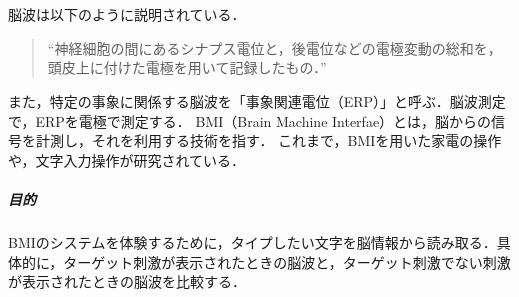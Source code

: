 \chapter{\kadaie}
\section{\purpose}
脳波は以下のように説明されている．
\begin{quote}
    ``神経細胞の間にあるシナプス電位と，後電位などの電極変動の総和を，頭皮上に付けた電極を用いて記録したもの．''
    \\\hfill\cite{自己心理学セミナー}
\end{quote}
また，特定の事象に関係する脳波を「事象関連電位（ERP）」と呼ぶ．脳波測定で，ERPを電極で測定する．
BMI（Brain Machine Interfae）とは，脳からの信号を計測し，それを利用する技術を指す\cite{脳波による実用的なBMI研究開発}．
これまで，BMIを用いた家電の操作や，文字入力操作が研究されている\cite{脳波による実用的なBMI研究開発}．
\paragraph{目的}BMIのシステムを体験するために，タイプしたい文字を脳情報から読み取る．具体的に，ターゲット刺激が表示されたときの脳波と，ターゲット刺激でない刺激が表示されたときの脳波を比較する．
\section{\method}
